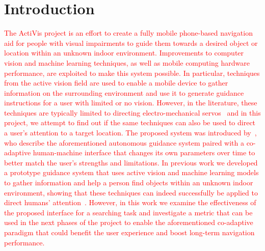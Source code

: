 \documentclass[acmsmall]{acmart}
\newcommand\hl[1]{\textcolor{red}{#1}}
\begin{document}


\maketitle

\section{Introduction}

\hl{The ActiVis project is an effort to create a fully mobile phone-based navigation aid for people with visual impairments to guide them towards a desired object or location within an unknown indoor environment.
Improvements to computer vision and machine learning techniques, as well as mobile computing hardware performance, are exploited to make this system possible.
In particular, techniques from the active vision field are used to enable a mobile device to gather information on the surrounding environment and use it to generate guidance instructions for a user with limited or no vision.
However, in the literature, these techniques are typically limited to directing electro-mechanical servos~\citep{bajcsy2018revisiting} and in this project, we attempt to find out if the same techniques can also be used to direct a user's attention to a target location. 
The proposed system was introduced by~\citet{lock2017portable}, who describe the aforementioned autonomous guidance system paired with a co-adaptive human-machine interface that changes its own parameters over time to better match the user's strengths and limitations.
In previous work we developed a prototype guidance system that uses active vision and machine learning models to gather information and help a person find objects within an unknown indoor environment, showing that these techniques can indeed successfully be applied to direct humans' attention~\citep{lock2019active}.
However, in this work we examine the effectiveness of the proposed interface for a searching task and investigate a metric that can be used in the next phases of the project to enable the aforementioned co-adaptive paradigm that could benefit the user experience and boost long-term navigation performance.}
\end{document}
